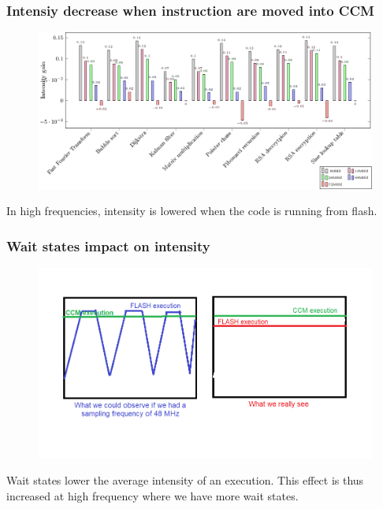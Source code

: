 \documentclass[
	11pt, %
]{beamer}
\begin{document}
\begin{frame}
	\frametitle{Intensiy decrease when instruction are moved into CCM}
	\begin{figure}
		\centering
        \includegraphics[scale=0.6]{data/stm32f_v2/code_flash_code_ccm/intensity.pdf}
	\end{figure}
	In high frequencies, intensity is lowered when the code is running from flash.
\end{frame}

\begin{frame}
	\frametitle{Wait states impact on intensity}
	\begin{figure}
		\centering
        \includegraphics[scale=0.7]{images/wait_state_impact.png}
	\end{figure}
	Wait states lower the average intensity of an execution. 
	This effect is thus increased at high frequency where we have more wait states.
\end{frame}
\end{document}
